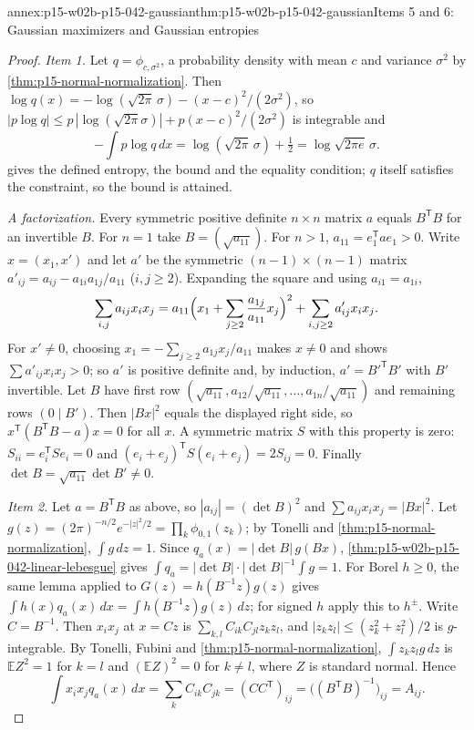 \begin{annexitem}{annex:p15-w02b-p15-042-gaussian}{thm:p15-w02b-p15-042-gaussian}{Items 5 and 6: Gaussian maximizers and Gaussian entropies}
\begin{proof}
\emph{Item 1.} Let \(q=\phi_{c,\sigma^2}\), a probability density with mean
\(c\) and variance \(\sigma^2\) by \cref{thm:p15-normal-normalization}. Then
\(\log q(x)=-\log(\sqrt{2\pi}\,\sigma)-(x-c)^2/(2\sigma^2)\), so
\(|p\log q|\leq p\,|\log(\sqrt{2\pi}\sigma)|+p(x-c)^2/(2\sigma^2)\) is
integrable and
\[
 -\int p\log q\,dx=\log(\sqrt{2\pi}\,\sigma)+\tfrac12
                  =\log\sqrt{2\pi e}\,\sigma .
\]
 gives the defined entropy, the bound and the
equality condition; \(q\) itself satisfies the constraint, so the bound is
attained.

\emph{A factorization.} Every symmetric positive definite \(n\times n\)
matrix \(a\) equals \(B^{\mathsf T}B\) for an invertible \(B\). For \(n=1\)
take \(B=(\sqrt{a_{11}})\). For \(n>1\), \(a_{11}=e_1^{\mathsf T}ae_1>0\).
Write \(x=(x_1,x')\) and let \(a'\) be the symmetric
\((n-1)\times(n-1)\) matrix
\(a'_{ij}=a_{ij}-a_{1i}a_{1j}/a_{11}\) (\(i,j\geq2\)). Expanding the square
and using \(a_{i1}=a_{1i}\),
\[
 \sum_{i,j}a_{ij}x_ix_j
   =a_{11}\Bigl(x_1+\sum_{j\geq2}\frac{a_{1j}}{a_{11}}x_j\Bigr)^2
    +\sum_{i,j\geq2}a'_{ij}x_ix_j .
\]
For \(x'\neq0\), choosing \(x_1=-\sum_{j\geq2}a_{1j}x_j/a_{11}\) makes
\(x\neq0\) and shows \(\sum a'_{ij}x_ix_j>0\); so \(a'\) is positive
definite and, by induction, \(a'=B'^{\mathsf T}B'\) with \(B'\) invertible.
Let \(B\) have first row
\((\sqrt{a_{11}},a_{12}/\sqrt{a_{11}},\ldots,a_{1n}/\sqrt{a_{11}})\) and
remaining rows \((0\mid B')\). Then \(|Bx|^2\) equals the displayed right
side, so \(x^{\mathsf T}(B^{\mathsf T}B-a)x=0\) for all \(x\). A symmetric
matrix \(S\) with this property is zero: \(S_{ii}=e_i^{\mathsf T}Se_i=0\) and
\((e_i+e_j)^{\mathsf T}S(e_i+e_j)=2S_{ij}=0\). Finally
\(\det B=\sqrt{a_{11}}\det B'\neq0\).

\emph{Item 2.} Let \(a=B^{\mathsf T}B\) as above, so
\(|a_{ij}|=(\det B)^2\) and \(\sum a_{ij}x_ix_j=|Bx|^2\). Let
\(g(z)=(2\pi)^{-n/2}e^{-|z|^2/2}=\prod_k\phi_{0,1}(z_k)\); by Tonelli and
\cref{thm:p15-normal-normalization}, \(\int g\,dz=1\). Since
\(q_a(x)=|\det B|\,g(Bx)\), \cref{thm:p15-w02b-p15-042-linear-lebesgue} gives
\(\int q_a=|\det B|\cdot|\det B|^{-1}\int g=1\). For Borel \(h\geq0\), the same
lemma applied to \(G(z)=h(B^{-1}z)g(z)\) gives
\(\int h(x)q_a(x)\,dx=\int h(B^{-1}z)g(z)\,dz\); for signed \(h\) apply this to
\(h^\pm\). Write \(C=B^{-1}\). Then
\(x_ix_j\) at \(x=Cz\) is \(\sum_{k,l}C_{ik}C_{jl}z_kz_l\), and
\(|z_kz_l|\leq(z_k^2+z_l^2)/2\) is \(g\)-integrable. By Tonelli, Fubini and
\cref{thm:p15-normal-normalization}, \(\int z_kz_lg\,dz\) is
\(\mathbb EZ^2=1\) for \(k=l\) and \((\mathbb EZ)^2=0\) for \(k\neq l\), where
\(Z\) is standard normal. Hence
\[
 \int x_ix_jq_a(x)\,dx=\sum_kC_{ik}C_{jk}=(CC^{\mathsf T})_{ij}
   =\bigl((B^{\mathsf T}B)^{-1}\bigr)_{ij}=A_{ij}.
\]


\end{proof}
\end{annexitem}
